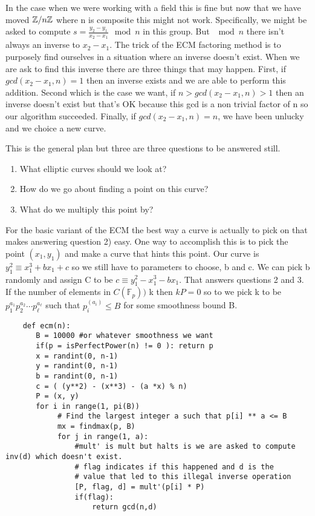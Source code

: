 \documentclass{article}
\begin{document}
In the case when we were working with a field this is fine but now that we have moved $\mathbb{Z} / n \mathbb{Z}$ where n is composite this might not work. Specifically, we might be asked to compute $s = \frac{y_2 - y_1}{x_2 -x_1} \mod n$ in this group. But $\mod n$ there isn't always an inverse to $x_2 - x_1$. The trick of the ECM factoring method is to purposely find ourselves in a situation where an inverse doesn't exist. When we are ask to find this inverse there are three things that may happen. First, if $gcd(x_2 - x_1 , n) = 1$ then an inverse exists and we are able to perform this addition. Second which is the case we want, if $n > gcd(x_2 - x_1, n) > 1$ then an inverse doesn't exist but that's OK because this gcd is a non trivial factor of n so our algorithm succeeded. Finally, if $gcd(x_2 - x_1, n) = n$, we have been unlucky and we choice a new curve.  

This is the general plan but three are three questions to be answered still.
\begin{enumerate}
    \item What elliptic curves should we look at?
    \item How do we go about finding a point on this curve?
    \item What do we multiply this point by?
\end{enumerate}
For the basic variant of the ECM the best way a curve is actually to pick on that makes answering question 2) easy. One way to accomplish this is to pick the point $(x_1, y_1)$ and make a curve that hints this point. Our curve is $y_1^2 \equiv x_1^3 + bx_1 + c$ so we still have to parameters to choose, b and c. We can pick b randomly and assign C to be $c \equiv y_1^2 -x_1^3 - bx_1$. That answers questions 2 and 3. If the number of elements in $C(\mathbb{F}_p))$ k then $kP = 0$ so to we pick k to be $p_1^{a_1} p_2^{a_2} \cdots p_\ell^{a_\ell}$ such that $p_i^(a_i) \leq B$ for some smoothness bound B. 
\begin{verbatim}
    def ecm(n):
       B = 10000 #or whatever smoothness we want
       if(p = isPerfectPower(n) != 0 ): return p
       x = randint(0, n-1)
       y = randint(0, n-1)
       b = randint(0, n-1)
       c = ( (y**2) - (x**3) - (a *x) % n)
       P = (x, y)
       for i in range(1, pi(B))
            # Find the largest integer a such that p[i] ** a <= B
            mx = findmax(p, B)
            for j in range(1, a):
                #mult' is mult but halts is we are asked to compute inv(d) which doesn't exist. 
                # flag indicates if this happened and d is the 
                # value that led to this illegal inverse operation
                [P, flag, d] = mult'(p[i] * P) 
                if(flag):
                    return gcd(n,d)
\end{verbatim}
\end{document}
